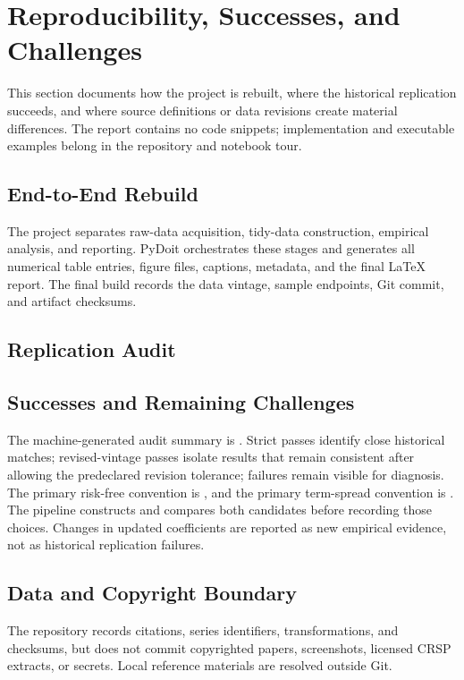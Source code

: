 \section{Reproducibility, Successes, and Challenges}

This section documents how the project is rebuilt, where the historical
replication succeeds, and where source definitions or data revisions create
material differences. The report contains no code snippets; implementation
and executable examples belong in the repository and notebook tour.

\subsection{End-to-End Rebuild}

The project separates raw-data acquisition, tidy-data construction, empirical
analysis, and reporting. PyDoit orchestrates these stages and generates all
numerical table entries, figure files, captions, metadata, and the final
LaTeX report. The final build records the data vintage, sample endpoints, Git
commit, and artifact checksums.

\subsection{Replication Audit}



\subsection{Successes and Remaining Challenges}

The machine-generated audit summary is \ReplicationAuditSummary. Strict passes
identify close historical matches; revised-vintage passes isolate results that
remain consistent after allowing the predeclared revision tolerance; failures
remain visible for diagnosis. The primary risk-free convention is
\RiskFreePrimary{}, and the primary term-spread convention is
\TermSpreadPrimary{}. The pipeline constructs and compares both candidates
before recording those choices. Changes in updated coefficients are reported
as new empirical evidence, not as historical replication failures.

\subsection{Data and Copyright Boundary}

The repository records citations, series identifiers, transformations, and
checksums, but does not commit copyrighted papers, screenshots, licensed CRSP
extracts, or secrets. Local reference materials are resolved outside Git.
